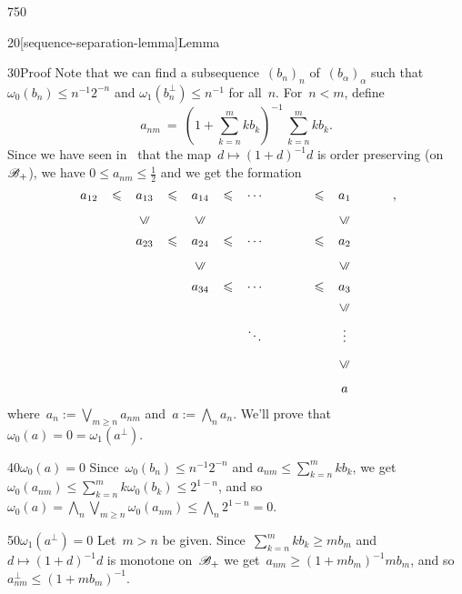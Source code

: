 \begin{parsec}{750}
\begin{point}{20}[sequence-separation-lemma]{Lemma}
\begin{point}{30}{Proof}
Note that we can find a subsequence~$(b_n)_n$ of~$(b_\alpha)_\alpha$
such that $\omega_0( b_n ) 
	\leq n^{-1}2^{-n}$
and $\omega_1(b_n^\perp)\leq n^{-1}$
for all~$n$.
For~$n < m$, define
\begin{equation*}
\textstyle
a_{nm}\ = \ (1+\sum_{k=n}^m kb_k)^{-1} \,\sum_{k=n}^m kb_k.
\end{equation*}
Since we have seen in~
that the map~$d\mapsto (1+d)^{-1}d$ is order preserving
(on~$\mathscr{B}_{+}$),
we have $0\leq a_{nm}\leq \frac{1}{2}$
and we get the formation
\begin{equation*}
\renewcommand{\labelstyle}{\textstyle}
\xymatrix{
a_{12}\ar@{}|-{\leq}[r] & 
a_{13}\ar@{}|-{\leq}[r] & 
a_{14}\ar@{}|-{\leq}[r]  & 
\dotsb & \ar@{}|-{\leq}[r]& a_1 \\
&
a_{23} \ar@{}|-{\leq}[r] \ar@{}[u]|-{\uleq} &
a_{24} \ar@{}|-{\leq}[r]  \ar@{}[u]|-{\uleq} &
\dotsb &\ar@{}|-{\leq}[r]& a_2  \ar@{}[u]|-{\uleq} \\
&
&
a_{34} \ar@{}|-{\leq}[r]  \ar@{}[u]|-{\uleq} & 
\dotsb & \ar@{}|-{\leq}[r] & a_3  \ar@{}[u]|-{\uleq} 
\\
&&&\ddots&&\vdots \ar@{}[u]|-{\uleq}& \\
&&&&&a\ar@{}[u]|-{\uleq}
},
\end{equation*}
where~$a_n:= \bigvee_{m\geq n} a_{nm}$
and~$a := \bigwedge_n a_n$.
We'll prove that~$\omega_0(a)=0=\omega_1(a^\perp)$.
\begin{point}{40}{$\omega_0(a)=0$}%
	Since~$\omega_0(b_n)\leq n^{-1}2^{-n}$ 
and $a_{nm}\leq \sum_{k=n}^m k b_k$,
we get~$\omega_0(a_{nm})\leq \sum_{k=n}^m k\omega_0(b_k) \leq 2^{1-n}$,
and so $\omega_0(a)=\bigwedge_n\bigvee_{m\geq n} \omega_0(a_{nm})
\leq \bigwedge_n 2^{1-n} = 0$.
\end{point}
\begin{point}{50}{$\omega_1(a^\perp )=0$}%
Let~$m> n$ be given.
Since~$\sum_{k=n}^m kb_k \geq mb_m$
and $d\mapsto (1+d)^{-1}d$
is monotone on~$\mathscr{B}_{+}$
we get~$a_{nm} \geq (1+mb_m)^{-1} mb_m$,
and so~$a_{nm}^\perp \leq (1+mb_m)^{-1}$.


\end{point}
\end{point}
\end{point}
\end{parsec}

